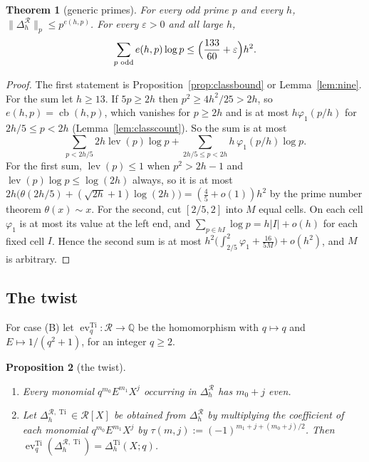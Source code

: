\documentclass[11pt]{amsart}
\newtheorem{theorem}{Theorem}[section]
\newtheorem{proposition}[theorem]{Proposition}
\theoremstyle{definition}
\theoremstyle{remark}
\numberwithin{equation}{section}
\newcommand{\QQ}{\mathbb{Q}}
\newcommand{\cR}{\mathcal{R}}
\newcommand{\eps}{\varepsilon}
\newcommand{\lev}{\operatorname{lev}}
\newcommand{\cb}{\operatorname{cb}}
\newcommand{\Ti}{\operatorname{Ti}}
\newcommand{\ev}{\operatorname{ev}}
\begin{document}
\begin{theorem}[generic primes]\label{thm:generic}
For every odd prime $p$ and every $h$, $\|\Delta^{\cR}_h\|_p\le p^{e(h,p)}$. For every $\eps>0$ and all large $h$,
\[
  \sum_{p\text{ odd}}e(h,p)\log p\le\Bigl(\frac{133}{60}+\eps\Bigr)h^2 .
\]
\end{theorem}

\begin{proof}
The first statement is Proposition~\ref{prop:classbound} or Lemma~\ref{lem:nine}. For the sum let $h\ge13$. If
$5p\ge2h$ then $p^2\ge4h^2/25>2h$, so $e(h,p)=\cb(h,p)$, which vanishes for $p\ge2h$ and is at most $h\varphi_1(p/h)$
for $2h/5\le p<2h$ (Lemma~\ref{lem:classcount}). So the sum is at most
\[
  \sum_{p<2h/5}2h\lev(p)\log p+\sum_{2h/5\le p<2h}h\,\varphi_1(p/h)\log p .
\]
For the first sum, $\lev(p)\le1$ when $p^2>2h-1$ and $\lev(p)\log p\le\log(2h)$ always, so it is at most
$2h\bigl(\theta(2h/5)+(\sqrt{2h}+1)\log(2h)\bigr)=(\frac45+o(1))h^2$ by the prime number theorem $\theta(x)\sim x$.
For the second, cut $[2/5,2]$ into $M$ equal cells. On each cell $\varphi_1$ is at most its value at the left end,
and $\sum_{p\in hI}\log p=h|I|+o(h)$ for each fixed cell $I$. Hence the second sum is at most
$h^2\bigl(\int_{2/5}^2\varphi_1+\frac{16}{5M}\bigr)+o(h^2)$, and $M$ is arbitrary.
\end{proof}

\subsection{The twist}\label{sec:twist}
For case (B) let $\ev^{\Ti}_{q}\colon\cR\to\QQ$ be the homomorphism with $q\mapsto q$ and $E\mapsto1/(q^2+1)$, for an
integer $q\ge2$.

\begin{proposition}[the twist]\label{prop:twist}
\begin{enumerate}
\item Every monomial $q^{m_0}E^{m_1}X^j$ occurring in $\Delta^{\cR}_h$ has $m_0+j$ even.
\item Let $\Delta^{\cR,\Ti}_h\in\cR[X]$ be obtained from $\Delta^{\cR}_h$ by multiplying the coefficient of each monomial
  $q^{m_0}E^{m_1}X^j$ by $\tau(m,j):=(-1)^{m_1+j+(m_0+j)/2}$. Then $\ev^{\Ti}_q(\Delta^{\cR,\Ti}_h)=\Delta^{\Ti}_h(X;q)$.
\end{enumerate}
\end{proposition}
\end{document}
